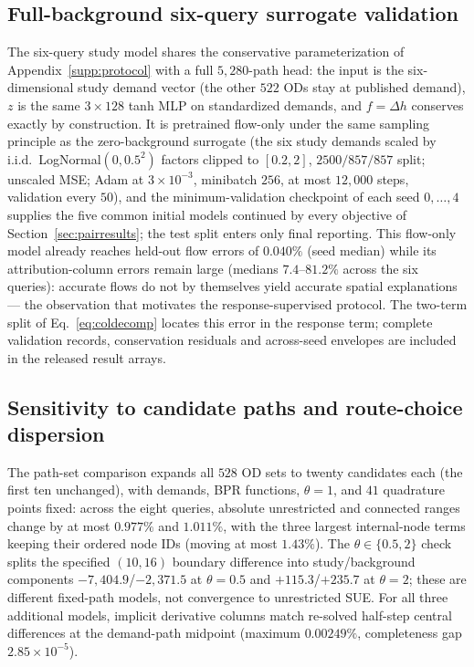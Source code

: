 \subsection{Full-background six-query surrogate validation}\label{supp:fullbgsurrogate}
The six-query study model shares the conservative parameterization of
Appendix~\ref{supp:protocol} with a full $5{,}280$-path head: the input
is the six-dimensional study demand vector (the other $522$ ODs stay
at published demand), $z$ is the same $3\times128$ tanh MLP on
standardized demands, and $f=\Delta h$ conserves exactly by
construction. It is pretrained flow-only under the same sampling
principle as the zero-background surrogate (the six study demands
scaled by i.i.d.\ LogNormal$(0,0.5^2)$ factors clipped to $[0.2,2]$,
$2500/857/857$ split; unscaled MSE; Adam at $3\times10^{-3}$,
minibatch $256$, at most $12{,}000$ steps, validation every $50$), and
the minimum-validation checkpoint of each seed $0,\ldots,4$ supplies
the five common initial models continued by every objective of
Section~\ref{sec:pairresults}; the test split enters only final
reporting. This flow-only model already reaches held-out flow errors
of $0.040\%$ (seed median) while its attribution-column errors remain
large (medians $7.4$--$81.2\%$ across the six queries): accurate flows
do not by themselves yield accurate spatial explanations --- the
observation that motivates the response-supervised protocol. The
two-term split of Eq.~\eqref{eq:coldecomp} locates this error in the
response term; complete validation records, conservation residuals and
across-seed envelopes are included in the released result arrays.

\subsection{Sensitivity to candidate paths and route-choice dispersion}\label{supp:coverage}
The path-set comparison expands all $528$ OD sets to twenty
candidates each (the first ten unchanged), with demands, BPR
functions, $\theta=1$, and $41$ quadrature points fixed: across the
eight queries, absolute unrestricted and connected ranges change by
at most $0.977\%$ and $1.011\%$, with the three largest
internal-node terms keeping their ordered node IDs (moving at most
$1.43\%$). The $\theta\in\{0.5,2\}$ check splits the specified
$(10,16)$ boundary difference into study/background components
$-7{,}404.9$/$-2{,}371.5$ at $\theta=0.5$ and $+115.3$/$+235.7$ at
$\theta=2$; these are different fixed-path models, not convergence to
unrestricted SUE. For all three additional models, implicit derivative
columns match re-solved half-step central differences at the
demand-path midpoint (maximum $0.00249\%$, completeness gap
$2.85\times10^{-5}$).

